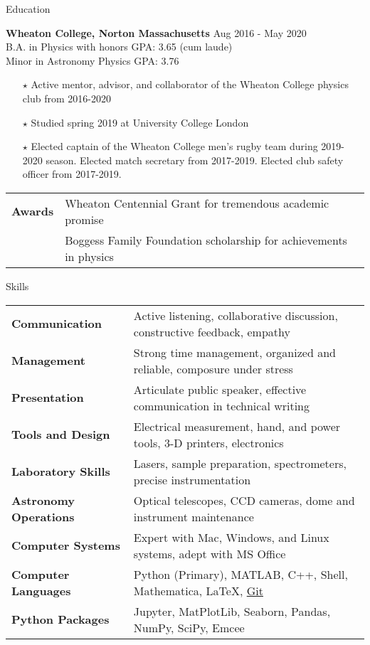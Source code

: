 \documentclass{resume} %
\begin{document}
\begin{rSection}{Education}

{\bf Wheaton College, Norton Massachusetts} \hfill {Aug 2016 - May 2020} \\
 B.A. in Physics with honors \hfill {GPA: 3.65 (cum laude)}
\\ Minor in Astronomy \hfill {Physics GPA: 3.76}
\begin{itemize}\itemsep -6pt
 \item[$\star$] Active mentor, advisor, and collaborator of the Wheaton College physics club from 2016-2020
 \item[$\star$] Studied spring 2019 at University College London
 \item[$\star$] Elected captain of the Wheaton College men's rugby team during 2019-2020 season. Elected match secretary from 2017-2019. Elected club safety officer from 2017-2019.
\end{itemize}
\begin{tabular}{ @{} >{\hspace{5mm}\bfseries}l @{\hspace{2ex}} l }
Awards & Wheaton Centennial Grant for tremendous academic promise\\
& Boggess Family Foundation scholarship for achievements in physics
\end{tabular}
\end{rSection}

\begin{rSection}{Skills}
\begin{tabular}{ @{} >{\bfseries}l @{\hspace{2ex}} l }
Communication & Active listening, collaborative discussion, constructive feedback, empathy\\
Management & Strong time management, organized and reliable, composure under stress\\
Presentation & Articulate public speaker, effective communication in technical writing \\
Tools and Design & Electrical measurement, hand, and power tools, 3-D printers, electronics\\
Laboratory Skills & Lasers, sample preparation, spectrometers, precise instrumentation\\
Astronomy Operations & Optical telescopes, CCD cameras, dome and instrument maintenance\\
Computer Systems & Expert with Mac, Windows, and Linux systems, adept with MS Office\\
Computer Languages &  Python (Primary), MATLAB, C++, Shell, Mathematica, \LaTeX, \href{https://github.com/seanmacb}{Git}\\
Python Packages & Jupyter, MatPlotLib, Seaborn, Pandas, NumPy, SciPy, Emcee\\


\end{tabular}
\end{rSection}
\end{document}
